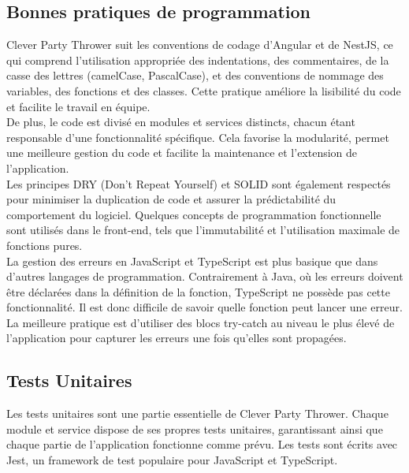 \subsection{Bonnes pratiques de programmation}\label{subsec:bonnes-pratiques-de-programmation}
Clever Party Thrower suit les conventions de codage d'Angular et de NestJS, ce qui comprend l'utilisation appropriée des indentations,
des commentaires, de la casse des lettres (camelCase, PascalCase), et des conventions de nommage des variables, des fonctions et des classes.
Cette pratique améliore la lisibilité du code et facilite le travail en équipe.\\

De plus, le code est divisé en modules et services distincts, chacun étant responsable d'une fonctionnalité spécifique.
Cela favorise la modularité, permet une meilleure gestion du code et facilite la maintenance et l'extension de l'application.\\

Les principes DRY (Don't Repeat Yourself) et SOLID sont également respectés pour minimiser la duplication de code et assurer la prédictabilité du comportement du logiciel.
Quelques concepts de programmation fonctionnelle sont utilisés dans le front-end, tels que l'immutabilité et l'utilisation maximale de fonctions pures.\\

La gestion des erreurs en JavaScript et TypeScript est plus basique que dans d'autres langages de programmation.
Contrairement à Java, où les erreurs doivent être déclarées dans la définition de la fonction, TypeScript ne possède pas cette fonctionnalité.
Il est donc difficile de savoir quelle fonction peut lancer une erreur.
La meilleure pratique est d'utiliser des blocs try-catch au niveau le plus élevé de l'application pour capturer les erreurs une fois qu'elles sont propagées.\\

\subsection{Tests Unitaires}\label{subsec:tests-unitaires}
Les tests unitaires sont une partie essentielle de Clever Party Thrower.
Chaque module et service dispose de ses propres tests unitaires, garantissant ainsi que chaque partie de l'application fonctionne comme prévu.
Les tests sont écrits avec Jest, un framework de test populaire pour JavaScript et TypeScript.\\


